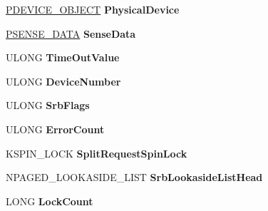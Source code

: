 \begin{DoxyCompactItemize}
\hyperlink{struct___d_e_v_i_c_e___o_b_j_e_c_t}{P\+D\+E\+V\+I\+C\+E\+\_\+\+O\+B\+J\+E\+CT} {\bfseries Physical\+Device}
\item 
\mbox{\label{struct___d_e_v_i_c_e___e_x_t_e_n_s_i_o_n_a2bdc46f650f45580123433325a05ae6d}} 
\hyperlink{struct___s_e_n_s_e___d_a_t_a}{P\+S\+E\+N\+S\+E\+\_\+\+D\+A\+TA} {\bfseries Sense\+Data}
\item 
\mbox{\label{struct___d_e_v_i_c_e___e_x_t_e_n_s_i_o_n_a4564559974340f1281a67261bf5feedd}} 
U\+L\+O\+NG {\bfseries Time\+Out\+Value}
\item 
\mbox{\label{struct___d_e_v_i_c_e___e_x_t_e_n_s_i_o_n_ae28285755c3e045d1a26cb7b75afe331}} 
U\+L\+O\+NG {\bfseries Device\+Number}
\item 
\mbox{\label{struct___d_e_v_i_c_e___e_x_t_e_n_s_i_o_n_a9e4214b9a0872a2c313438e46903ed6e}} 
U\+L\+O\+NG {\bfseries Srb\+Flags}
\item 
\mbox{\label{struct___d_e_v_i_c_e___e_x_t_e_n_s_i_o_n_af7a51047450402eb37d445cf02fa00a6}} 
U\+L\+O\+NG {\bfseries Error\+Count}
\item 
\mbox{\label{struct___d_e_v_i_c_e___e_x_t_e_n_s_i_o_n_a55ef674a416a764f70602f71189837fc}} 
K\+S\+P\+I\+N\+\_\+\+L\+O\+CK {\bfseries Split\+Request\+Spin\+Lock}
\item 
\mbox{\label{struct___d_e_v_i_c_e___e_x_t_e_n_s_i_o_n_a4e6b551d7d2035e602a9cd5ee0a2e2b6}} 
N\+P\+A\+G\+E\+D\+\_\+\+L\+O\+O\+K\+A\+S\+I\+D\+E\+\_\+\+L\+I\+ST {\bfseries Srb\+Lookaside\+List\+Head}
\item 
\mbox{\label{struct___d_e_v_i_c_e___e_x_t_e_n_s_i_o_n_a139b2846d896238267634454b2eeb7d8}} 
L\+O\+NG {\bfseries Lock\+Count}
\item 
\mbox{\label{struct___d_e_v_i_c_e___e_x_t_e_n_s_i_o_n_ac14ac3eb41d7385cade946665b67b6d6}} 

\end{DoxyCompactItemize}
